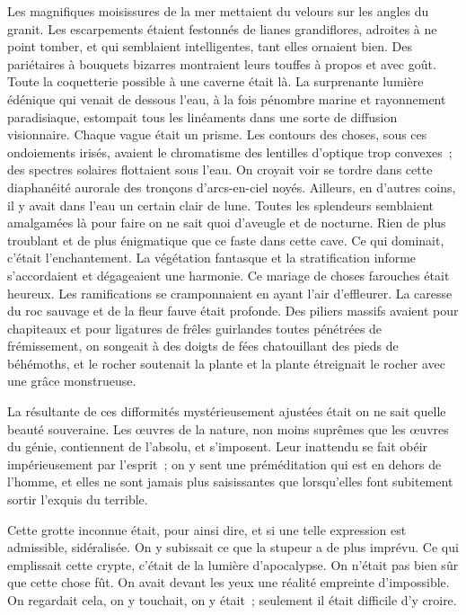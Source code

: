 \documentclass[french,twoside]{book} %
\begin{document}
Les magnifiques moisissures de la mer mettaient du velours sur les angles du granit. Les escarpements étaient festonnés de lianes grandiflores, adroites à ne point tomber, et qui semblaient intelligentes, tant elles ornaient bien. Des pariétaires à bouquets bizarres montraient leurs touffes à propos et avec goût. Toute la coquetterie possible à une caverne était là. La surprenante lumière édénique qui venait de dessous l’eau, à la fois pénombre marine et rayonnement paradisiaque, estompait tous les linéaments dans une sorte de diffusion visionnaire. Chaque vague était un prisme. Les contours des choses, sous ces ondoiements irisés,  avaient le chromatisme des lentilles d’optique trop convexes ; des spectres solaires flottaient sous l’eau. On croyait voir se tordre dans cette diaphanéité aurorale des tronçons d’arcs-en-ciel noyés. Ailleurs, en d’autres coins, il y avait dans l’eau un certain clair de lune. Toutes les splendeurs semblaient amalgamées là pour faire on ne sait quoi d’aveugle et de nocturne. Rien de plus troublant et de plus énigmatique que ce faste dans cette cave. Ce qui dominait, c’était l’enchantement. La végétation fantasque et la stratification informe s’accordaient et dégageaient une harmonie. Ce mariage de choses farouches était heureux. Les ramifications se cramponnaient en ayant l’air d’effleurer. La caresse du roc sauvage et de la fleur fauve était profonde. Des piliers massifs avaient pour chapiteaux et pour ligatures de frêles guirlandes toutes pénétrées de frémissement, on songeait à des doigts de fées chatouillant des pieds de béhémoths, et le rocher soutenait la plante et la plante étreignait le rocher avec une grâce monstrueuse.\par
La résultante de ces difformités mystérieusement ajustées était on ne sait quelle beauté souveraine. Les œuvres de la nature, non moins suprêmes que les œuvres du génie, contiennent de l’absolu, et s’imposent. Leur inattendu se fait obéir impérieusement par l’esprit ; on y sent une préméditation qui est en dehors de l’homme, et elles ne sont jamais plus saisissantes que lorsqu’elles font subitement sortir l’exquis du terrible.\par
Cette grotte inconnue était, pour ainsi dire, et si  une telle expression est admissible, sidéralisée. On y subissait ce que la stupeur a de plus imprévu. Ce qui emplissait cette crypte, c’était de la lumière d’apocalypse. On n’était pas bien sûr que cette chose fût. On avait devant les yeux une réalité empreinte d’impossible. On regardait cela, on y touchait, on y était ; seulement il était difficile d’y croire.\par
\end{document}

